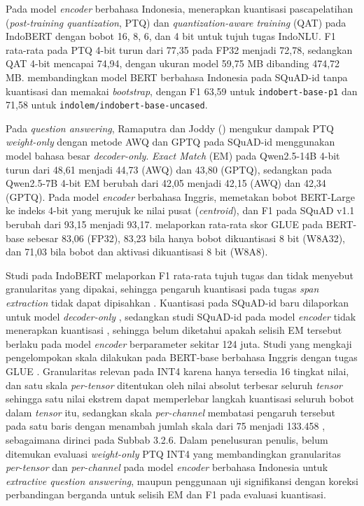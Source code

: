 Pada model \textit{encoder} berbahasa Indonesia, \textcite{abdurrahman2023implementing} menerapkan kuantisasi pascapelatihan (\textit{post-training quantization}, PTQ) dan \textit{quantization-aware training} (QAT) pada IndoBERT dengan bobot 16, 8, 6, dan 4 bit untuk tujuh tugas IndoNLU. F1 rata-rata pada PTQ 4-bit turun dari 77,35 pada FP32 menjadi 72,78, sedangkan QAT 4-bit mencapai 74,94, dengan ukuran model 59,75 MB dibanding 474,72 MB. \textcite{suhendra2026matrik} membandingkan model BERT berbahasa Indonesia pada SQuAD-id tanpa kuantisasi dan memakai \textit{bootstrap}, dengan F1 63,59 untuk \texttt{indobert-base-p1} dan 71,58 untuk \texttt{indolem/indobert-base-uncased}.

Pada \textit{question answering}, Ramaputra dan Joddy (\citeyear{ramaputra2026evaluating}) mengukur dampak PTQ \textit{weight-only} dengan metode AWQ dan GPTQ pada SQuAD-id menggunakan model bahasa besar \textit{decoder-only}. \textit{Exact Match} (EM) pada Qwen2.5-14B 4-bit turun dari 48,61 menjadi 44,73 (AWQ) dan 43,80 (GPTQ), sedangkan pada Qwen2.5-7B 4-bit EM berubah dari 42,05 menjadi 42,15 (AWQ) dan 42,34 (GPTQ). Pada model \textit{encoder} berbahasa Inggris, \textcite{zadeh2022mokey} memetakan bobot BERT-Large ke indeks 4-bit yang merujuk ke nilai pusat (\textit{centroid}), dan F1 pada SQuAD v1.1 berubah dari 93,15 menjadi 93,17. \textcite{bondarenko2021understanding} melaporkan rata-rata skor GLUE pada BERT-base sebesar 83,06 (FP32), 83,23 bila hanya bobot dikuantisasi 8 bit (W8A32), dan 71,03 bila bobot dan aktivasi dikuantisasi 8 bit (W8A8).

Studi pada IndoBERT melaporkan F1 rata-rata tujuh tugas dan tidak menyebut granularitas yang dipakai, sehingga pengaruh kuantisasi pada tugas \textit{span extraction} tidak dapat dipisahkan \parencite{abdurrahman2023implementing}. Kuantisasi pada SQuAD-id baru dilaporkan untuk model \textit{decoder-only} \parencite{ramaputra2026evaluating}, sedangkan studi SQuAD-id pada model \textit{encoder} tidak menerapkan kuantisasi \parencite{suhendra2026matrik}, sehingga belum diketahui apakah selisih EM tersebut berlaku pada model \textit{encoder} berparameter sekitar 124 juta. Studi yang mengkaji pengelompokan skala dilakukan pada BERT-base berbahasa Inggris dengan tugas GLUE \parencite{bondarenko2021understanding}. Granularitas relevan pada INT4 karena hanya tersedia 16 tingkat nilai, dan satu skala \textit{per-tensor} ditentukan oleh nilai absolut terbesar seluruh \textit{tensor} sehingga satu nilai ekstrem dapat memperlebar langkah kuantisasi seluruh bobot dalam \textit{tensor} itu, sedangkan skala \textit{per-channel} membatasi pengaruh tersebut pada satu baris dengan menambah jumlah skala dari 75 menjadi 133.458 \parencite{gholami2021survey}, sebagaimana dirinci pada Subbab 3.2.6. Dalam penelusuran penulis, belum ditemukan evaluasi \textit{weight-only} PTQ INT4 yang membandingkan granularitas \textit{per-tensor} dan \textit{per-channel} pada model \textit{encoder} berbahasa Indonesia untuk \textit{extractive question answering}, maupun penggunaan uji signifikansi dengan koreksi perbandingan berganda untuk selisih EM dan F1 pada evaluasi kuantisasi.

